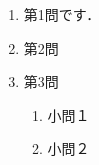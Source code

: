 \documentclass[landscape,b4paper,twocolumn]{jarticle}
\begin{document}
\medskip
\begin{enumerate}\itemindent.5\zw
	\item 第1問です．
	\vfill
	\item 第2問
	\vfill
\newpage
	\item 第3問
	\begin{enumerate}
		\item 小問１
		\vfill
		\item 小問２
		\vfill\vfill
	\end{enumerate}
\end{enumerate}
\end{document}
